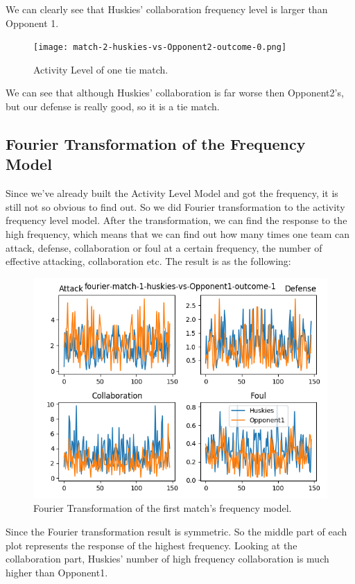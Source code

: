 \documentclass{mcmthesis}
\begin{document}
	We can clearly see that Huskies' collaboration frequency level is larger than Opponent 1. 
	
	\begin{figure}[h!]
		\centering
		\texttt{[image: match-2-huskies-vs-Opponent2-outcome-0.png]}
		\caption{Activity Level of one tie match. }
	\end{figure}
	
	We can see that although Huskies' collaboration is far worse then Opponent2's, but our defense is really good, so it is a tie match. 
	
	
	\subsection{Fourier Transformation of the Frequency Model}
		Since we've already built the Activity Level Model and got the frequency, it is still not so obvious to find out. So we did Fourier transformation to the activity frequency level model. After the transformation, we can find the response to the high frequency, which means that we can find out how many times one team can attack, defense, collaboration or foul at a certain frequency, the number of effective attacking, collaboration etc. The result is as the following: 
		\begin{figure}[h!]
			\centering
			\includegraphics[scale=0.7]{images/fourier-match-1-huskies-vs-Opponent1-outcome-1.png}
			\caption{Fourier Transformation of the first match's frequency model. }
		\end{figure} 
		
		Since the Fourier transformation result is symmetric. So the middle part of each plot represents the response of the highest frequency. Looking at the collaboration part, Huskies' number of high frequency collaboration is much higher than Opponent1. 
		
\end{document}
